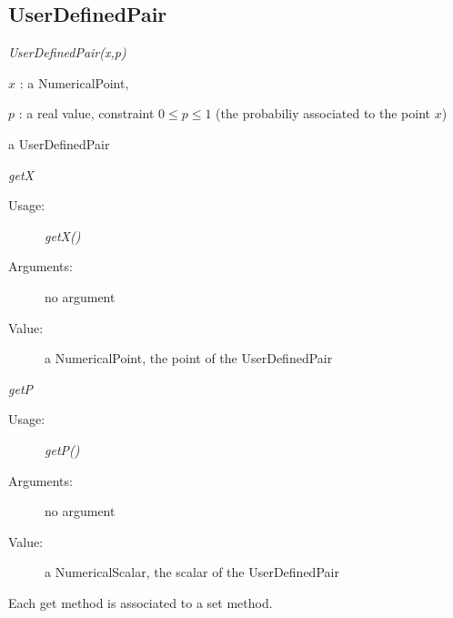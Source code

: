 

\newpage
\subsection{UserDefinedPair}

\begin{description}

\item[Usage:] \textit{UserDefinedPair(x,p)}

\item[Arguments:]  \rule{0pt}{1em}
\begin{description}
\item $x$ : a NumericalPoint,
\item $p$ : a real value, constraint $0 \leq p \leq 1$ (the probabiliy associated to the point $x$)
\end{description}

\item[Value:] a UserDefinedPair

\item[Some methods :]  \rule{0pt}{1em}

\begin{description}

\item \textit{getX}
\begin{description}
\item[Usage:] \textit{getX()}
\item[Arguments:] no argument
\item[Value:] a NumericalPoint, the point of the UserDefinedPair
\end{description}
\bigskip

\item \textit{getP}
\begin{description}
\item[Usage:] \textit{getP()}
\item[Arguments:] no argument
\item[Value:]  a NumericalScalar, the scalar of the UserDefinedPair
\end{description}

Each get method is associated to a set method.
\end{description}
\end{description}




